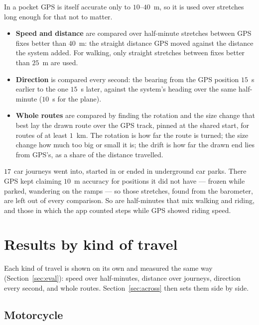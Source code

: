 \documentclass[11pt]{article}
\begin{document}
In a pocket GPS is itself accurate only to $10$--$40$~m, so it is used over stretches long enough for
that not to matter.
\begin{itemize}
\item \textbf{Speed and distance} are compared over half-minute stretches between GPS fixes better than
$40$~m: the straight distance GPS moved against the distance the system added. For walking, only
straight stretches between fixes better than $25$~m are used.
\item \textbf{Direction} is compared every second: the bearing from the GPS position $15$~s earlier to
the one $15$~s later, against the system's heading over the same half-minute ($10$~s for the plane).
\item \textbf{Whole routes} are compared by finding the rotation and the size change that best lay the
drawn route over the GPS track, pinned at the shared start, for routes of at least $1$~km. The
rotation is how far the route is
turned; the size change how much too big or small it is; the drift is how far the drawn end lies from
GPS's, as a share of the distance travelled.
\end{itemize}

$17$ car journeys went into, started in or ended in underground car parks. There GPS kept claiming
$10$~m accuracy for positions it did not have --- frozen while parked, wandering on the ramps --- so
those stretches, found from the barometer, are left out of every comparison. So are half-minutes that
mix walking and riding, and those in which the app counted steps while GPS showed riding speed\nAppDownTxt{}.

\clearpage
\section{Results by kind of travel}\label{sec:results}\suppressfloats[t]

Each kind of travel is shown on its own and measured the same way (Section~\ref{sec:eval}): speed over
half-minutes, distance over journeys, direction every second, and whole routes.
Section~\ref{sec:across} then sets them side by side.

\subsection{Motorcycle}\label{sec:moto}\suppressfloats[t]
\end{document}
